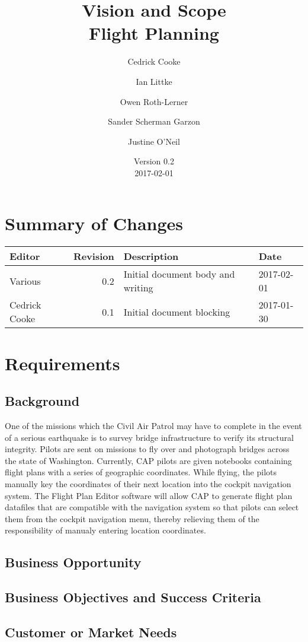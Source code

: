 \documentclass[12pt, letterpaper]{article}
\title{Vision and Scope \\
Flight Planning
}
\author{ Cedrick Cooke
    \and Ian Littke
    \and Owen Roth-Lerner
    \and Sander Scherman Garzon
    \and Justine O'Neil
}
\date{Version 0.2 \\ 2017-02-01}
\begin{document}
\maketitle

\tableofcontents

\section*{Summary of Changes}
\begin{tabularx}{\textwidth}{|l|r|X|l|}
\hline
Editor & Revision & Description & Date \\ \hline \hline
Various & 0.2 & Initial document body and writing & 2017-02-01 \\ \hline
Cedrick Cooke & 0.1 & Initial document blocking & 2017-01-30 \\ \hline
\end{tabularx}

\section{Requirements}
\subsection{Background}
One of the missions which the Civil Air Patrol may have to complete in the event of a serious earthquake is to survey bridge infrastructure to verify its structural integrity.  Pilots are sent on missions to fly over and photograph bridges across the state of Washington.  Currently, CAP pilots are given notebooks containing flight plans with a series of geographic coordinates.  While flying, the pilots manually key the coordinates of their next location into the cockpit navigation system.  The Flight Plan Editor software will allow CAP to generate flight plan datafiles that are compatible with the navigation system so that pilots can select them from the cockpit navigation menu, thereby relieving them of the responsibility of manualy entering location coordinates.

\subsection{Business Opportunity}


\subsection{Business Objectives and Success Criteria}
\subsection{Customer or Market Needs}
\end{document}
